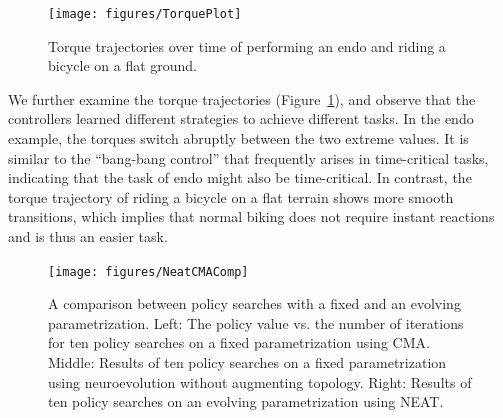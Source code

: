 \begin{figure}[ht]
  \centering
  \texttt{[image: figures/TorquePlot]}
  \caption{Torque trajectories over time of performing an endo and riding a bicycle on a flat ground. }
  \label{fig:torquePlot}
\end{figure}

We further examine the torque trajectories (Figure~\ref{fig:torquePlot}), and observe that the controllers learned different strategies to achieve different tasks. In the endo example, the torques switch abruptly between the two extreme values. It is similar to the ``bang-bang control'' that frequently arises in time-critical tasks, indicating that the task of endo might also be time-critical. In contrast, the torque trajectory of riding a bicycle on a flat terrain shows more smooth transitions, which implies that normal biking does not require instant reactions and is thus an easier task.

\begin{figure}[ht]
  \centering
  \texttt{[image: figures/NeatCMAComp]}
  \caption{A comparison between policy searches with a fixed and an evolving parametrization. Left: The policy value vs. the number of iterations for ten policy searches on a fixed parametrization using CMA. Middle: Results of ten policy searches on a fixed parametrization using neuroevolution without augmenting topology. Right: Results of ten policy searches on an evolving parametrization using NEAT. }
  \label{fig:compare}
\end{figure}

